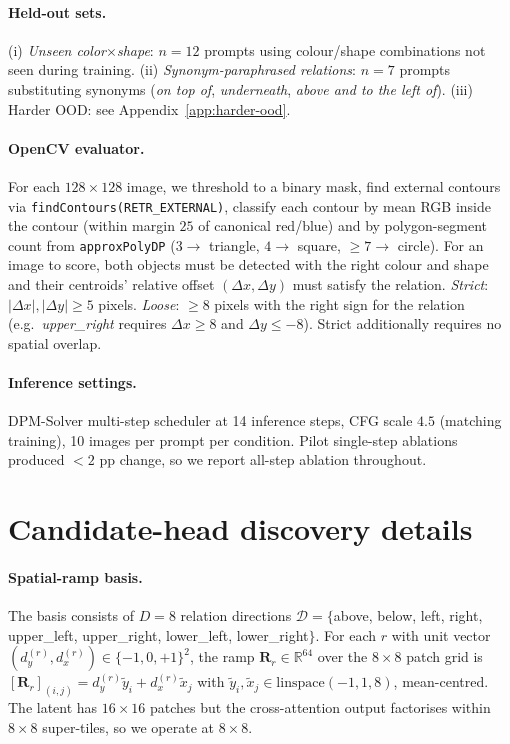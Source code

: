 \documentclass{article}
\begin{document}
\paragraph{Held-out sets.} (i) \emph{Unseen color$\times$shape}: $n{=}12$ prompts using colour/shape combinations not seen during training. (ii) \emph{Synonym-paraphrased relations}: $n{=}7$ prompts substituting synonyms (\textit{on top of}, \textit{underneath}, \textit{above and to the left of}). (iii) Harder OOD: see Appendix~\ref{app:harder-ood}.

\paragraph{OpenCV evaluator.} For each $128\!\times\!128$ image, we threshold to a binary mask, find external contours via \texttt{findContours(RETR\_EXTERNAL)}, classify each contour by mean RGB inside the contour (within margin $25$ of canonical red/blue) and by polygon-segment count from \texttt{approxPolyDP} ($3 \to$ triangle, $4 \to$ square, $\geq 7 \to$ circle). For an image to score, both objects must be detected with the right colour and shape and their centroids' relative offset $(\Delta x, \Delta y)$ must satisfy the relation. \emph{Strict}: $|\Delta x|, |\Delta y| \geq 5$ pixels. \emph{Loose}: $\geq 8$ pixels with the right sign for the relation (e.g.\ \textit{upper\_right} requires $\Delta x \geq 8$ and $\Delta y \leq -8$). Strict additionally requires no spatial overlap.

\paragraph{Inference settings.} DPM-Solver multi-step scheduler at 14 inference steps, CFG scale $4.5$ (matching training), 10 images per prompt per condition. Pilot single-step ablations produced $<\!2$ pp change, so we report all-step ablation throughout.

\section{Candidate-head discovery details}
\label{app:discovery}

\paragraph{Spatial-ramp basis.} The basis consists of $D{=}8$ relation directions $\mathcal{D} = \{$above, below, left, right, upper\_left, upper\_right, lower\_left, lower\_right$\}$. For each $r$ with unit vector $(d_y^{(r)}, d_x^{(r)}) \in \{-1, 0, +1\}^2$, the ramp $\mathbf{R}_r \in \mathbb{R}^{64}$ over the $8\!\times\!8$ patch grid is $[\mathbf{R}_r]_{(i,j)} = d_y^{(r)} \tilde y_i + d_x^{(r)} \tilde x_j$ with $\tilde y_i, \tilde x_j \in \mathrm{linspace}(-1, 1, 8)$, mean-centred. The latent has $16\!\times\!16$ patches but the cross-attention output factorises within $8\!\times\!8$ super-tiles, so we operate at $8\!\times\!8$.
\end{document}
